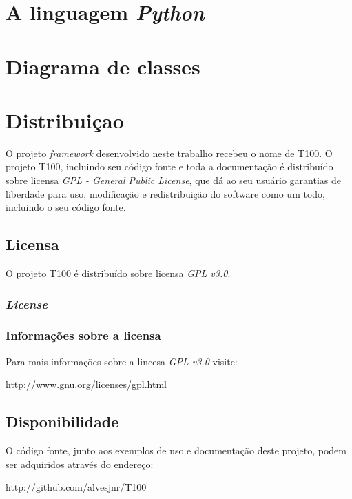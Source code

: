 \chapter{A linguagem \textit{Python} \label{appendix_python}}
\chapter{Diagrama de classes \label{appendix_uml_completo}}
\chapter{Distribuiçao}

O projeto \textit{framework} desenvolvido neste trabalho recebeu o nome de T100. O projeto T100, incluindo seu código fonte e toda a documentação é distribuído sobre licensa \textit{GPL - General Public License}, que dá ao seu usuário garantias de liberdade para uso, modificação e redistribuição do software como um todo, incluindo o seu código fonte.

\section{Licensa}

O projeto T100 é distribuído sobre licensa \textit{GPL v3.0}.

\subsection{\emph{License}}



\subsection{Informações sobre a licensa}

Para mais informações sobre a lincesa \textit{GPL v3.0} visite:

http://www.gnu.org/licenses/gpl.html

\section{Disponibilidade}

O código fonte, junto aos exemplos de uso e documentação deste projeto, podem ser adquiridos através do endereço:

http://github.com/alvesjnr/T100


